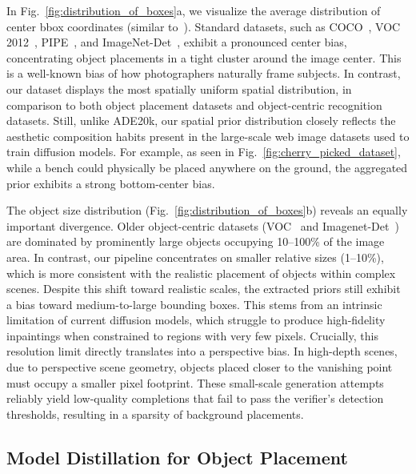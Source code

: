 In Fig.~\ref{fig:distribution_of_boxes}a, we visualize the average distribution of center bbox coordinates (similar to~\cite{gupta2019lvis}). Standard datasets, such as COCO~\cite{lin2014microsoft}, VOC 2012~\cite{pascal-voc-2012}, PIPE~\cite{wasserman2024paint}, and ImageNet-Det~\cite{pascal-voc-2012}, exhibit a pronounced center bias, concentrating object placements in a tight cluster around the image center. This is a well-known bias of how photographers naturally frame subjects. In contrast, our dataset displays the most spatially uniform spatial distribution, in comparison to both object placement datasets and object-centric recognition datasets. Still, unlike ADE20k, our spatial prior distribution closely reflects the aesthetic composition habits present in the large-scale web image datasets used to train diffusion models. For example, as seen in Fig.~\ref{fig:cherry_picked_dataset}, while a bench could physically be placed anywhere on the ground, the aggregated prior exhibits a strong bottom-center bias.


The object size distribution (Fig.~\ref{fig:distribution_of_boxes}b) reveals an equally important divergence. Older object-centric datasets (VOC~\cite{pascal-voc-2012} and Imagenet-Det~\cite{pascal-voc-2012}) are dominated by prominently large objects occupying 10–100\% of the image area. In contrast, our pipeline concentrates on smaller relative sizes (1–10\%), which is more consistent with the realistic placement of objects within complex scenes. Despite this shift toward realistic scales, the extracted priors still exhibit a bias toward medium-to-large bounding boxes. This stems from an intrinsic limitation of current diffusion models, which struggle to produce high-fidelity inpaintings when constrained to regions with very few pixels. Crucially, this resolution limit directly translates into a perspective bias. In high-depth scenes, due to perspective scene geometry, objects placed closer to the vanishing point must occupy a smaller pixel footprint. These small-scale generation attempts reliably yield low-quality completions that fail to pass the verifier's detection thresholds, resulting in a sparsity of background placements.

\subsection{Model Distillation for Object Placement}
\label{sec:model_distillation}

